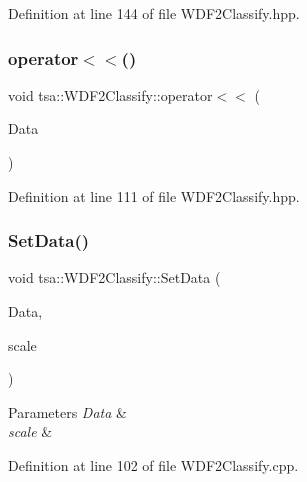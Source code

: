Definition at line 144 of file W\+D\+F2\+Classify.\+hpp.

\mbox{\label{classtsa_1_1_w_d_f2_classify_a742b607d6e01e6788ab440caffa7f689}} 
\subsubsection{\texorpdfstring{operator$<$$<$()}{operator<<()}}
{\footnotesize\ttfamily void tsa\+::\+W\+D\+F2\+Classify\+::operator$<$$<$ (\begin{DoxyParamCaption}\item[{\hyperlink{namespacetsa_ac599574bcc094eda25613724b8f3ca9e}{Seq\+View\+Double} \&}]{Data }\end{DoxyParamCaption})\hspace{0.3cm}{\ttfamily [inline]}}



Definition at line 111 of file W\+D\+F2\+Classify.\+hpp.

\mbox{\label{classtsa_1_1_w_d_f2_classify_a06ef587765f9590fabe3a25c5a46efb1}} 
\subsubsection{\texorpdfstring{Set\+Data()}{SetData()}}
{\footnotesize\ttfamily void tsa\+::\+W\+D\+F2\+Classify\+::\+Set\+Data (\begin{DoxyParamCaption}\item[{\hyperlink{namespacetsa_ad260cd21c1891c4ed391fe788569aba4}{Dmatrix} \&}]{Data,  }\item[{double}]{scale }\end{DoxyParamCaption})}


\begin{DoxyParams}{Parameters}
{\em Data} & \\
\hline
{\em scale} & \\
\hline
\end{DoxyParams}


Definition at line 102 of file W\+D\+F2\+Classify.\+cpp.



